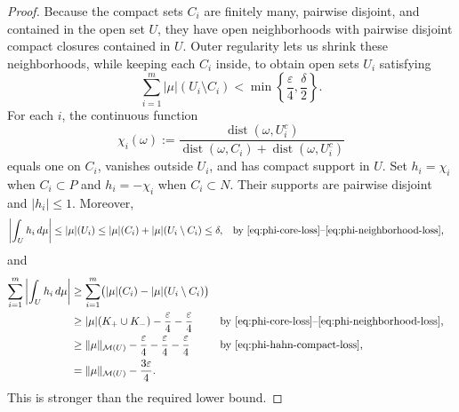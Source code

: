 \documentclass[11pt]{amsart}
\theoremstyle{definition}
\theoremstyle{remark}
\begin{document}
\begin{proof}
Because the compact sets $C_i$ are finitely many, pairwise disjoint, and
contained in the open set $U$, they have open neighborhoods with pairwise
disjoint compact closures contained in $U$. Outer regularity lets us shrink
these neighborhoods, while keeping each $C_i$ inside, to obtain open sets $U_i$ satisfying
\begin{equation}
\label{eq:phi-neighborhood-loss}
	\sum_{i=1}^m|\mu|(U_i\setminus C_i)
	<\min\left\{\frac{\varepsilon}{4},\frac{\delta}{2}\right\}.
\end{equation}
For each $i$, the continuous function
\begin{equation*}
	\chi_i(\omega)
	:=\frac{\operatorname{dist}(\omega,U_i^c)}
	{\operatorname{dist}(\omega,C_i)+\operatorname{dist}(\omega,U_i^c)}
\end{equation*}
equals one on $C_i$, vanishes outside $U_i$, and has compact support in $U$.
Set $h_i=\chi_i$ when $C_i\subset P$ and $h_i=-\chi_i$ when $C_i\subset N$.
Their supports are pairwise disjoint and $|h_i|\le1$. Moreover,
\begin{align*}
	\left|\int_U h_i\,d\mu\right|
	&\le |\mu|(U_i)
	\le |\mu|(C_i)+|\mu|(U_i\setminus C_i)
	\le\delta,
	&&\text{by \eqref{eq:phi-core-loss}--\eqref{eq:phi-neighborhood-loss},}
\end{align*}
and
\begin{align*}
	\sum_{i=1}^m\left|\int_U h_i\,d\mu\right|
	&\ge \sum_{i=1}^m
		\bigl(|\mu|(C_i)-|\mu|(U_i\setminus C_i)\bigr)\\
	&\ge |\mu|(K_+\cup K_-)
		-\frac{\varepsilon}{4}-\frac{\varepsilon}{4}
	&&\text{by \eqref{eq:phi-core-loss}--\eqref{eq:phi-neighborhood-loss},}\\
	&\ge \|\mu\|_{\mathcal M(U)}
		-\frac{\varepsilon}{4}-\frac{\varepsilon}{4}-\frac{\varepsilon}{4}
	&&\text{by \eqref{eq:phi-hahn-compact-loss},}\\
	&=\|\mu\|_{\mathcal M(U)}-\frac{3\varepsilon}{4}.
\end{align*}
This is stronger than the required lower bound.
\end{proof}
\end{document}

